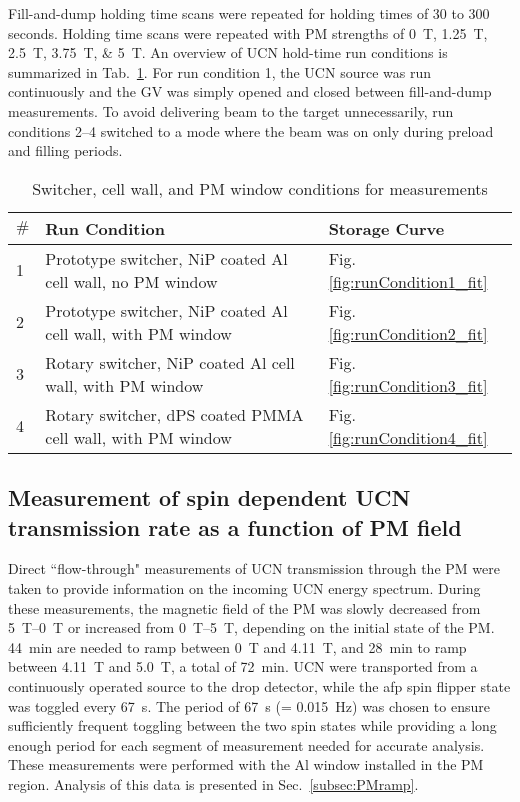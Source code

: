 Fill-and-dump holding time scans were repeated for holding times of 30 to 300 seconds. Holding time scans were repeated with PM strengths of \qtylist{0; 1.25; 2.5; 3.75; 5}{\tesla}. An overview of UCN hold-time run conditions is summarized in Tab.~\ref{tb:runconditions}. For run condition 1, the UCN source was run continuously and the GV was simply opened and closed between fill-and-dump measurements. To avoid delivering beam to the target unnecessarily, run conditions 2--4 switched to a mode where the beam was on only during preload and filling periods.

\begin{table}
\centering
\caption[North beamline characterization run conditions]{\label{tb:runconditions}Switcher, cell wall, and PM window conditions for measurements} 
\begin{tabular}{lll}
\toprule
\multicolumn{1}{l}{$\#$} & \multicolumn{1}{l}{Run Condition}  & \multicolumn{1}{l}{Storage Curve} \\
\midrule
 1 & Prototype switcher, NiP coated Al cell wall, no  PM window & Fig. \ref{fig:runCondition1_fit} \\  
 2 & Prototype switcher, NiP coated Al cell wall, with PM window & Fig. \ref{fig:runCondition2_fit} \\
 3 & Rotary switcher, NiP coated Al cell wall, with PM window & Fig. \ref{fig:runCondition3_fit} \\
 4 & Rotary switcher, dPS coated PMMA cell wall, with PM window & Fig. \ref{fig:runCondition4_fit} \\
\bottomrule
\end{tabular}
\end{table}


\subsection{\label{subsec:PMrampMeasurement}Measurement of spin dependent UCN transmission rate as a function of PM field}


Direct ``flow-through" measurements of UCN transmission through the PM were taken to provide information on the incoming UCN energy spectrum. During these measurements, the magnetic field of the PM was slowly decreased from \qtyrange{5}{0}{\tesla} or increased from \qtyrange{0}{5}{\tesla}, depending on the initial state of the PM. \qty{44}{\minute} are needed to ramp between 0~T and 4.11~T, and \qty{28}{\minute} to ramp between 4.11~T and 5.0~T, a total of \qty{72}{\minute}. UCN were transported from a continuously operated source to the drop detector, while the \acrshort{afp} spin flipper state was toggled every \qty{67}{\s}. The period of 67~s (= \qty{0.015}{Hz}) was chosen to ensure sufficiently frequent toggling between the two spin states while providing a long enough period for each segment of measurement needed for accurate analysis. These measurements were performed with the Al window installed in the PM region. Analysis of this data is presented in Sec.~\ref{subsec:PMramp}.

